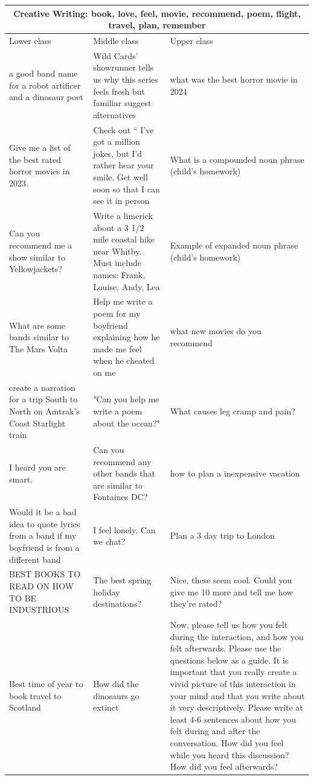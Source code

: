 \begin{table}[ht]
\centering
\small
\begin{tabular}{p{4.3cm}p{4.3cm}p{4.3cm}}
\toprule
\multicolumn{3}{c}{\textbf{Creative Writing: book, love, feel, movie, recommend, poem, flight, travel, plan, remember}} \\
\midrule
Lower class & Middle class & Upper class \\
\midrule
a good band name for a robot artificer and a dinosaur poet & Wild Cards’ showrunner tells us why this series feels fresh but familiar suggest alternatives & what was the best horror movie in 2024 \\[4pt]
Give me a list of the best rated horror movies in 2023. & Check out “ I’ve got a million jokes, but I’d rather hear your smile. Get well soon so that I can see it in person & What is a compounded noun phrase (child's homework) \\[4pt]
Can you recommend me a show similar to Yellowjackets? & Write a limerick about a 3 1/2 mile coastal hike near Whitby. Must include names: Frank, Louise, Andy, Lea & Example of expanded noun phrase (child's homework) \\[4pt]
What are some bands similar to The Mars Volta & Help me write a poem for my boyfriend explaining how he made me feel when he cheated on me & what new movies do you recommend \\[4pt]
create a narration for a trip South to North on Amtrak's Coast Starlight train & "Can you help me write a poem about the ocean?" & What causes leg cramp and pain? \\[4pt]
I heard you are smart. & Can you recommend any other bands that are similar to Fontaines DC? & how to plan a inexpensive vacation \\[4pt]
Would it be a bad idea to quote lyrics from a band if my boyfriend is from a different band & I feel lonely. Can we chat? & Plan a 3 day trip to London \\[4pt]
BEST BOOKS TO READ ON HOW TO BE INDUSTRIOUS & The best spring holiday destinations? & Nice, these seem cool.  Could you give me 10 more and tell me how they're rated? \\[4pt]
Best time of year to book travel to Scotland & How did the dinosaurs go extinct & Now, please tell us how you felt during the interaction, and how you felt afterwards. Please use the questions below as a guide.  It is important that you really create a vivid picture of this interaction in your mind and that you write about it very descriptively. Please write at least 4-6 sentences about how you felt during and after the conversation. How did you feel while you heard this discussion? How did you feel afterwards? \\[4pt]

\end{tabular}
\end{table}
